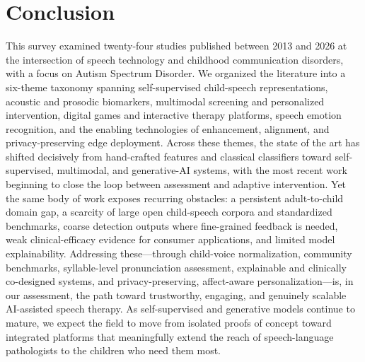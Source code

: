 \documentclass[conference]{IEEEtran}
\begin{document}
\section{Conclusion}
\label{sec:conclusion}
This survey examined twenty-four studies published between 2013 and 2026 at the intersection of speech technology and childhood communication disorders, with a focus on Autism Spectrum Disorder. We organized the literature into a six-theme taxonomy spanning self-supervised child-speech representations, acoustic and prosodic biomarkers, multimodal screening and personalized intervention, digital games and interactive therapy platforms, speech emotion recognition, and the enabling technologies of enhancement, alignment, and privacy-preserving edge deployment. Across these themes, the state of the art has shifted decisively from hand-crafted features and classical classifiers toward self-supervised, multimodal, and generative-AI systems, with the most recent work beginning to close the loop between assessment and adaptive intervention. Yet the same body of work exposes recurring obstacles: a persistent adult-to-child domain gap, a scarcity of large open child-speech corpora and standardized benchmarks, coarse detection outputs where fine-grained feedback is needed, weak clinical-efficacy evidence for consumer applications, and limited model explainability. Addressing these---through child-voice normalization, community benchmarks, syllable-level pronunciation assessment, explainable and clinically co-designed systems, and privacy-preserving, affect-aware personalization---is, in our assessment, the path toward trustworthy, engaging, and genuinely scalable AI-assisted speech therapy. As self-supervised and generative models continue to mature, we expect the field to move from isolated proofs of concept toward integrated platforms that meaningfully extend the reach of speech-language pathologists to the children who need them most.
\end{document}
